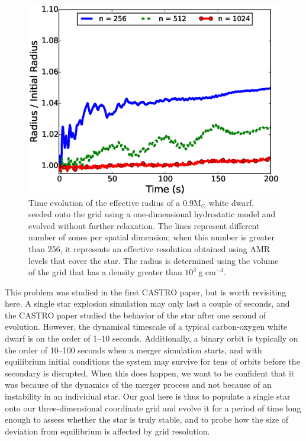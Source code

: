 \documentclass[iop]{emulateapj}
\newcommand{\msolar}{\mathrm{M}_\odot}
\begin{document}
\begin{figure}
  \centering
  \includegraphics[scale=0.45]{plots/single_star_static_1e3_radius}
  \caption{Time evolution of the effective radius of a $0.9 \msolar$ 
    white dwarf, seeded onto the grid using a one-dimensional hydrostatic
    model and evolved without further relaxation. The lines represent 
    different number of zones per spatial dimension; when this number is 
    greater than 256, it represents an effective resolution obtained 
    using AMR levels that cover the star. The radius is determined 
    using the volume of the grid that has a density greater than $10^3\ \text{g cm}^{-3}.$
    \label{fig:single_star_static_radius}}
\end{figure}

This problem was studied in the first CASTRO paper, but is worth
revisiting here. A single star explosion simulation may only last a
couple of seconds, and the CASTRO paper studied the behavior of the
star after one second of evolution. However, the dynamical timescale
of a typical carbon-oxygen white dwarf is on the order of 1--10
seconds. Additionally, a binary orbit is typically on the order of
10--100 seconds when a merger simulation starts, and with equilibrium
initial conditions the system may survive for tens of orbits before
the secondary is disrupted. When this does happen, we want to be
confident that it was because of the dynamics of the merger process
and not because of an instability in an individual star. Our goal here
is thus to populate a single star onto our three-dimensional
coordinate grid and evolve it for a period of time long enough to
assess whether the star is truly stable, and to probe how the size of
deviation from equilibrium is affected by grid resolution.
\end{document}
